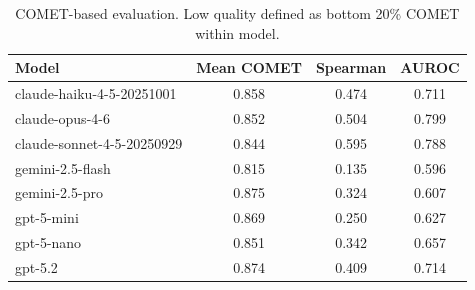 \begin{table}[t]
\centering
\begin{tabular}{lccc}
\toprule
Model & Mean COMET & Spearman & AUROC \\
\midrule
claude-haiku-4-5-20251001 & 0.858 & 0.474 & 0.711 \\
claude-opus-4-6 & 0.852 & 0.504 & 0.799 \\
claude-sonnet-4-5-20250929 & 0.844 & 0.595 & 0.788 \\
gemini-2.5-flash & 0.815 & 0.135 & 0.596 \\
gemini-2.5-pro & 0.875 & 0.324 & 0.607 \\
gpt-5-mini & 0.869 & 0.250 & 0.627 \\
gpt-5-nano & 0.851 & 0.342 & 0.657 \\
gpt-5.2 & 0.874 & 0.409 & 0.714 \\
\bottomrule
\end{tabular}
\caption{COMET-based evaluation. Low quality defined as bottom 20\% COMET within model.}
\label{tab:comet}
\end{table}
